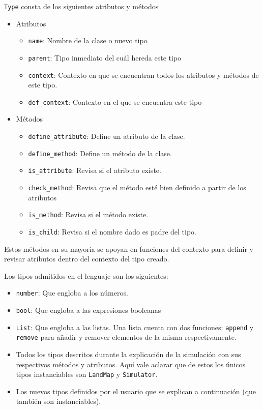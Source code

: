  \verb|Type| consta de los siguientes atributos y m\'etodos 
  \begin{itemize}
  \item Atributos
  \begin{itemize}
  \item \verb|name|: Nombre de la clase o nuevo tipo
  
  \item \verb|parent|: Tipo inmediato del cuál hereda este tipo
  
  \item \verb|context|: Contexto en que se encuentran todos los atributos y métodos de este tipo. 
  
  \item \verb|def_context|: Contexto en el que se encuentra este tipo
  \end{itemize}
  
  \item M\'etodos
  \begin{itemize}  
  \item \verb|define_attribute|: Define un atributo de la clase.
  
  \item \verb|define_method|: Define un m\'etodo de la clase.
  
  \item \verb|is_attribute|: Revisa si el atributo existe.
  
  \item \verb|check_method|: Revisa que el método esté bien definido a partir de los atributos
  
  \item \verb|is_method|: Revisa si el m\'etodo existe.
  
  \item \verb|is_child|: Revisa si el nombre dado es padre del tipo.
  \end{itemize}
  \end{itemize}
  Estos métodos en su mayoría se apoyan en funciones del contexto para definir y revisar atributos dentro del contexto del tipo creado.
  
  Los tipos admitidos en el lenguaje son los siguientes:
  
  \begin{itemize}
  	\item \verb|number|: Que engloba a los n\'umeros.
  	\item \verb|bool|: Que engloba a las expresiones booleanas
  	\item \verb|List|: Que engloba a las listas. Una lista cuenta con dos funciones: \verb|append| y \verb|remove| para a\~{n}adir y remover elementos de la misma respectivamente.
  	\item Todos los tipos descritos durante la explicaci\'on de la simulaci\'on con sus respectivos m\'etodos y atributos. Aqu\'i vale aclarar que de estos los \'unicos tipos instanciables son \verb|LandMap| y \verb|Simulator|.
  	\item Los nuevos tipos definidos por el usuario que se explican a continuaci\'on (que tambi\'en son instanciables).
  \end{itemize}
  
